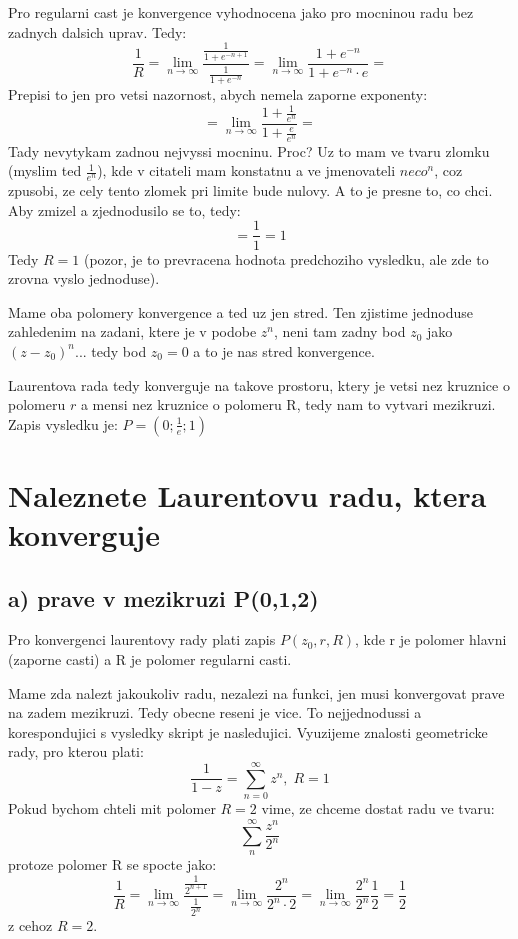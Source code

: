 Pro regularni cast je konvergence vyhodnocena jako pro mocninou radu bez zadnych dalsich uprav. Tedy:
$$\frac{1}{R} = \lim_{n \to \infty} \frac{\frac{1}{1+e^{-n+1}}}{\frac{1}{1+e^{-n}}} = \lim_{n \to \infty} \frac{1+e^{-n}}{1+e^{-n}\cdot e} = $$
Prepisi to jen pro vetsi nazornost, abych nemela zaporne exponenty:
$$= \lim_{n \to \infty}  \frac{1+\frac{1}{e^n}}{1+\frac{e}{e^n}} =$$
Tady nevytykam zadnou nejvyssi mocninu. Proc? Uz to mam ve tvaru zlomku (myslim ted $\frac{1}{e^n}$), kde v citateli mam konstatnu a ve jmenovateli $neco^n$, coz zpusobi, ze cely tento zlomek pri limite bude nulovy. A to je presne to, co chci. Aby zmizel a zjednodusilo se to, tedy:
$$ = \frac{1}{1} = 1$$
Tedy $R = 1$ (pozor, je to prevracena hodnota predchoziho vysledku, ale zde to zrovna vyslo jednoduse).

Mame oba polomery konvergence a ted uz jen stred. Ten zjistime jednoduse zahledenim na zadani, ktere je v podobe $z^n$, neni tam zadny bod $z_0$ jako $(z-z_0)^n$... tedy bod $z_0 = 0$ a to je nas stred konvergence. 

Laurentova rada tedy konverguje na takove prostoru, ktery je vetsi nez kruznice o polomeru $r$ a mensi nez kruznice o polomeru R, tedy nam to vytvari mezikruzi. Zapis vysledku je:
$P=(0; \frac{1}{e}; 1)$

\newpage

\section{Naleznete Laurentovu radu, ktera konverguje}
\subsection{a) prave v mezikruzi P(0,1,2)}
Pro konvergenci laurentovy rady plati zapis $P(z_0, r, R)$, kde r je polomer hlavni (zaporne casti) a R je polomer regularni casti. 

Mame zda nalezt jakoukoliv radu, nezalezi na funkci, jen musi konvergovat prave na zadem mezikruzi. Tedy obecne reseni je vice. To nejjednodussi a korespondujici s vysledky skript je nasledujici. Vyuzijeme znalosti geometricke rady, pro kterou plati:
$$\frac{1}{1-z} = \sum_{n=0}^\infty z^n, \; R=1$$
Pokud bychom chteli mit polomer $R=2$ vime, ze chceme dostat radu ve tvaru:
$$\sum_n^\infty \frac{z^n}{2^n}$$
protoze polomer R se spocte jako:
$$\frac{1}{R} = \lim_{n \to \infty} \frac{\frac{1}{2^{n+1}}}{\frac{1}{2^n}} = \lim_{n \to \infty} \frac{2^n}{2^n\cdot 2} = \lim_{n \to \infty} \frac{2^n}{2^n} \frac{1}{2} = \frac{1}{2} $$
z cehoz $R = 2$.

